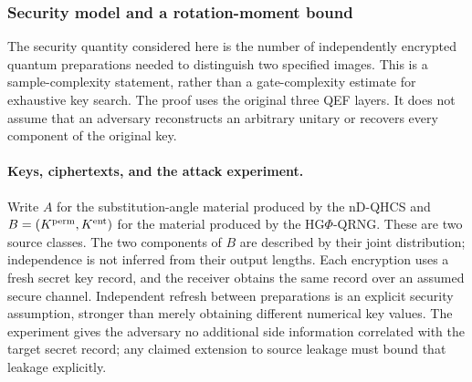 \subsubsection{Security model and a rotation-moment bound}
\label{sec:qef_moment_security}
{\color{red}
The security quantity considered here is the number of independently
encrypted quantum preparations needed to distinguish two specified images.
This is a sample-complexity statement, rather than a gate-complexity estimate
for exhaustive key search. The proof uses the original three QEF layers.
It does not assume that an adversary reconstructs an arbitrary unitary or
recovers every component of the original key.

\paragraph{Keys, ciphertexts, and the attack experiment.}
Write $A$ for the substitution-angle material produced by the nD-QHCS and
$B=(K^{\rm perm},K^{\rm ent})$ for the material produced by the
HG$\Phi$-QRNG. These are two source classes. The two components of $B$
are described by their joint distribution; independence is not inferred
from their output lengths. Each encryption uses a fresh secret key record,
and the receiver obtains the same record over an assumed secure channel.
Independent refresh between preparations is an explicit security
assumption, stronger than merely obtaining different numerical key values.
The experiment gives the adversary no additional side information
correlated with the target secret record; any claimed extension to
source leakage must bound that leakage explicitly.

}
